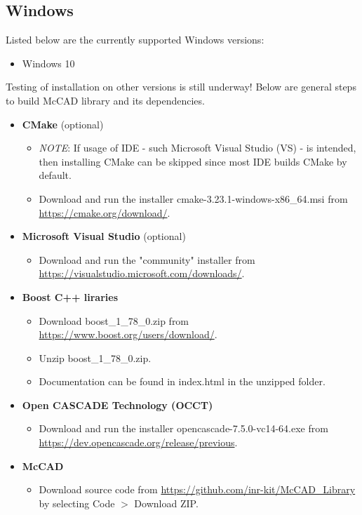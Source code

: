 \documentclass[12pt, a4paper, titlepage]{article}
\begin{document}
  \subsection{Windows}
    Listed below are the currently supported Windows versions:
    \begin{itemize}
  	  \item Windows 10
    \end{itemize} 
    Testing of installation on other versions is still underway! Below are general steps to build McCAD library and its dependencies.
    \begin{itemize}
	  \item \textbf{CMake} (optional)
 	  \begin{itemize}
    	\item \emph{NOTE}: If usage of IDE - such Microsoft Visual Studio (VS) - is intended, then installing CMake can be skipped since most IDE builds CMake by default.
 		\item Download and run the installer cmake-3.23.1-windows-x86\_64.msi from \url{https://cmake.org/download/}.
  	  \end{itemize}
	  \item \textbf{Microsoft Visual Studio} (optional)
	  \begin{itemize}
		\item Download and run the "community" installer from \url{https://visualstudio.microsoft.com/downloads/}.
	  \end{itemize}
      \item \textbf{Boost C++ liraries}
      \begin{itemize}
    	\item Download boost\_1\_78\_0.zip from \url{https://www.boost.org/users/download/}.
    	\item Unzip boost\_1\_78\_0.zip.
    	\item Documentation can be found in index.html in the unzipped folder.
      \end{itemize}
      \item \textbf{Open CASCADE Technology (OCCT)}
	  \begin{itemize}
		\item Download and run the installer opencascade-7.5.0-vc14-64.exe from \url{https://dev.opencascade.org/release/previous}.
	  \end{itemize}
	  \item \textbf{McCAD}
	  \begin{itemize}
		\item Download source code from \url{https://github.com/inr-kit/McCAD_Library} by selecting Code $>$ Download ZIP.

\end{itemize}
\end{itemize}
\end{document}
